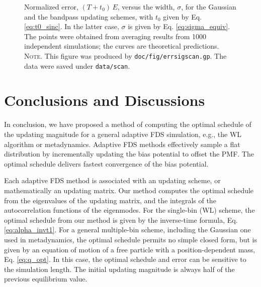 \documentclass[reprint, floatfix]{revtex4-1}
\newcommand{\note}[1]{{\color{DarkGreen}\footnotesize \textsc{Note.} #1}}
\begin{document}
\begin{figure}[h]
\begin{center}
  \caption{
    \label{fig:errsigscan}
    Normalized error, $(T + t_0) \, E$,
    versus the width, $\sigma$,
    for the Gaussian
    and the bandpass updating schemes,
    with $t_0$ given by Eq. \eqref{eq:t0_sinc}.
    In the latter case,
    $\sigma$ is given by Eq. \eqref{eq:sigma_equiv}.
    The points were obtained from averaging results
    from 1000 independent simulations;
    the curves are theoretical predictions.
    \note{This figure was produced by
      \texttt{doc/fig/errsigscan.gp}.
      The data were saved under
      \texttt{data/scan}.
    }%
  }
\end{center}
\end{figure}





\section{\label{sec:conclusion}
Conclusions and Discussions}



In conclusion,
we have proposed a method of computing
the optimal schedule of the updating magnitude
for a general adaptive FDS simulation,
e.g., the WL algorithm or metadynamics.
%
Adaptive FDS methods
effectively sample a flat distribution
by incrementally updating the bias potential
to offset the PMF.
%
The optimal schedule delivers fastest convergence
of the bias potential.



Each adaptive FDS method is associated with
an updating scheme,
or mathematically an updating matrix.
%
Our method computes the optimal schedule from
the eigenvalues of the updating matrix,
and the integrals of the autocorrelation functions
of the eigenmodes.
%
For the single-bin (WL) scheme,
the optimal schedule from our method
is given by the inverse-time formula,
Eq. \eqref{eq:alpha_invt1}.
%
For a general multiple-bin scheme,
including the Gaussian one used in metadynamics,
the optimal schedule permits no simple closed form,
but is given by an equation of motion
of a free particle with a position-dependent mass, Eq. \eqref{eq:q_opt}.
%
In this case,
the optimal schedule and error
can be sensitive to the simulation length.
%
The initial updating magnitude is always
half of the previous equilibrium value.
\end{document}
